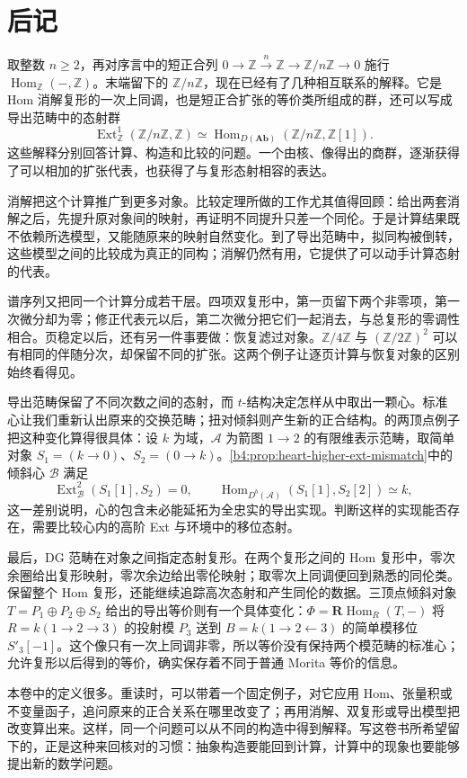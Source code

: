 \chapter*{后记}

取整数 \(n\ge2\)，再对序言中的短正合列 \(0\to\mathbb Z\xrightarrow{n}\mathbb Z\to\mathbb Z/n\mathbb Z\to0\) 施行 \(\operatorname{Hom}_{\mathbb Z}(-,\mathbb Z)\)。末端留下的 \(\mathbb Z/n\mathbb Z\)，现在已经有了几种相互联系的解释。它是 Hom 消解复形的一次上同调，也是短正合扩张的等价类所组成的群，还可以写成导出范畴中的态射群
\[
	\operatorname{Ext}_{\mathbb Z}^1(\mathbb Z/n\mathbb Z,\mathbb Z) \simeq \operatorname{Hom}_{D(\mathbf{Ab})}(\mathbb Z/n\mathbb Z,\mathbb Z[1]).
\]
这些解释分别回答计算、构造和比较的问题。一个由核、像得出的商群，逐渐获得了可以相加的扩张代表，也获得了与复形态射相容的表达。

\ProseParagraphBreak
消解把这个计算推广到更多对象。比较定理所做的工作尤其值得回顾：给出两套消解之后，先提升原对象间的映射，再证明不同提升只差一个同伦。于是计算结果既不依赖所选模型，又能随原来的映射自然变化。到了导出范畴中，拟同构被倒转，这些模型之间的比较成为真正的同构；消解仍然有用，它提供了可以动手计算态射的代表。

\ProseParagraphBreak
谱序列又把同一个计算分成若干层。四项双复形中，第一页留下两个非零项，第一次微分却为零；修正代表元以后，第二次微分把它们一起消去，与总复形的零调性相合。页稳定以后，还有另一件事要做：恢复滤过对象。\(\mathbb Z/4\mathbb Z\) 与 \((\mathbb Z/2\mathbb Z)^2\) 可以有相同的伴随分次，却保留不同的扩张。这两个例子让逐页计算与恢复对象的区别始终看得见。

\ProseParagraphBreak
导出范畴保留了不同次数之间的态射，而 \(t\)-结构决定怎样从中取出一颗心。标准心让我们重新认出原来的交换范畴；扭对倾斜则产生新的正合结构。的两顶点例子把这种变化算得很具体：设 \(k\) 为域，\(\mathcal A\) 为箭图 \(1\to2\) 的有限维表示范畴，取简单对象 \(S_1=(k\to0)\)、\(S_2=(0\to k)\)。\cref{b4:prop:heart-higher-ext-mismatch}中的倾斜心 \(\mathcal B\) 满足
\[
	\operatorname{Ext}_{\mathcal B}^2(S_1[1],S_2)=0, \qquad \operatorname{Hom}_{D^b(\mathcal A)}(S_1[1],S_2[2])\simeq k,
\]
这一差别说明，心的包含未必能延拓为全忠实的导出实现。判断这样的实现能否存在，需要比较心内的高阶 Ext 与环境中的移位态射。

\ProseParagraphBreak
最后，DG 范畴在对象之间指定态射复形。在两个复形之间的 Hom 复形中，零次余圈给出复形映射，零次余边给出零伦映射；取零次上同调便回到熟悉的同伦类。保留整个 Hom 复形，还能继续追踪高次态射和产生同伦的数据。三顶点倾斜对象 \(T=P_1\oplus P_2\oplus S_2\) 给出的导出等价则有一个具体变化：\(\Phi=\mathbf R\operatorname{Hom}_R(T,-)\) 将 \(R=k(1\to2\to3)\) 的投射模 \(P_3\) 送到 \(B=k(1\to2\leftarrow3)\) 的简单模移位 \(S'_3[-1]\)。这个像只有一次上同调非零，所以等价没有保持两个模范畴的标准心；允许复形以后得到的等价，确实保存着不同于普通 Morita 等价的信息。

\ProseParagraphBreak
本卷中的定义很多。重读时，可以带着一个固定例子，对它应用 Hom、张量积或不变量函子，追问原来的正合关系在哪里改变了；再用消解、双复形或导出模型把改变算出来。这样，同一个问题可以从不同的构造中得到解释。写这卷书所希望留下的，正是这种来回核对的习惯：抽象构造要能回到计算，计算中的现象也要能够提出新的数学问题。
